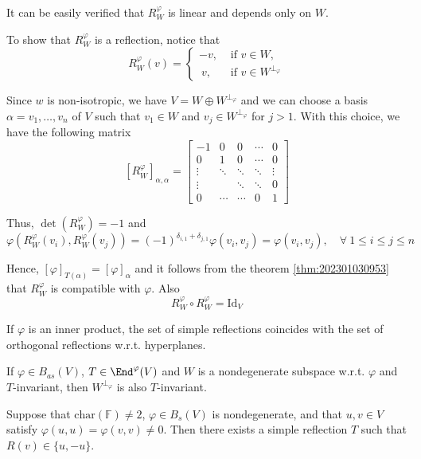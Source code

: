 It can be easily verified that $R_W^\varphi$ is linear and depends only on $W$. 

To show that $R_W^\varphi$ is a reflection, notice that 
\[
  R_W^\varphi(v) = \begin{cases}
    -v, & \text{ if } v \in W, \\
    ~v, & \text{ if } v \in W^{\perp_\varphi}
  \end{cases}
\]

Since $w$ is non-isotropic, we have $V = W \oplus W^{\perp_\varphi}$ and we can choose a basis $\alpha = v_1, \ldots, v_n$ of $V$ such that $v_1 \in W$ and $v_j \in W^{\perp_\varphi}$ for $j > 1$. With this choice, we have the following matrix 
\[
  [R_W^\varphi]_{\alpha, \alpha} = \begin{bmatrix}
    -1 & 0 & 0 & \cdots & 0 \\
    0  & 1 & 0 & \cdots & 0 \\
    \vdots & \ddots & \ddots & \ddots & \vdots \\ 
    \vdots & & \ddots & \ddots & 0 \\
    0 & \cdots & \cdots & 0 & 1
  \end{bmatrix}
\]

Thus, $\det(R_W^\varphi) = -1$ and 
\[
  \varphi(R_W^\varphi(v_i), R_W^\varphi(v_j)) = (-1)^{\delta_{i, 1} + \delta_{j,1}} \varphi(v_i, v_j) = \varphi(v_i, v_j), \quad \forall~1 \leq i \leq j \leq n
\]

Hence, $[\varphi]_{T(\alpha)} = [\varphi]_\alpha$ and it follows from the theorem \ref{thm:202301030953} that $R_W^\varphi$ is compatible with $\varphi$. Also
\[
  R_W^\varphi \circ R_W^\varphi = \text{Id}_V
\]

If $\varphi$ is an inner product, the set of simple reflections coincides with the set of orthogonal reflections w.r.t. hyperplanes.

\begin{lemma}\label{lm:202301040856}
  If $\varphi \in B_{as}(V)$, $T \in \End^\varphi(V)$ and $W$ is a nondegenerate subspace w.r.t. $\varphi$ and $T$-invariant, then $W^{\perp_\varphi}$ is also $T$-invariant. 
\end{lemma}

\begin{lemma}\label{lm:202301040857}
  Suppose that $\text{char}(\mathbb{F}) \neq 2$, $\varphi \in B_s(V)$ is nondegenerate, and that $u, v \in V$ satisfy $\varphi(u,u) = \varphi(v,v) \neq 0$. Then there exists a simple reflection $T$ such that $R(v) \in \{ u, -u \}$.
\end{lemma}

